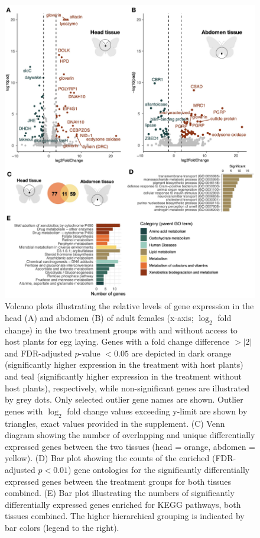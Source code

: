 \documentclass[lineno]{wiley-article}
\begin{document}
\begin{figure}[t]
\centering
\includegraphics[width=14cm]{‎Vanessa_RNAseq_Figures2.‎001.jpeg}
\caption{Volcano plots illustrating the relative levels of gene expression in the head (A) and abdomen (B) of adult females (x-axis; \(\log_2\) fold change) in the two treatment groups with and without access to host plants for egg laying. Genes with a fold change difference \( > |2| \) and FDR-adjusted \( p \)-value \( < 0.05 \) are depicted in dark orange (significantly higher expression in the treatment with host plants) and teal (significantly higher expression in the treatment without host plants), respectively, while non-significant genes are illustrated by grey dots. Only selected outlier gene names are shown. Outlier genes with \(\log_2\) fold change values exceeding y-limit are shown by triangles, exact values provided in the supplement. (C) Venn diagram showing the number of overlapping and unique differentially expressed genes between the two tissues (head = orange, abdomen = yellow). (D) Bar plot showing the counts of the enriched (FDR-adjusted \( p < 0.01 \)) gene ontologies for the significantly differentially expressed genes between the treatment groups for both tissues combined. (E) Bar plot illustrating the numbers of significantly differentially expressed genes enriched for KEGG pathways, both tissues combined. The higher hierarchical grouping is indicated by bar colors (legend to the right).}

\end{figure}
\end{document}
